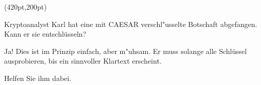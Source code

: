 

\PapierGroesse(420pt,200pt)



\parskip=5pt
\baselineskip=13pt
Kryptoanalyst Karl hat eine mit CAESAR verschl"usselte Botschaft abgefangen. Kann er sie entschlüsseln? 

Ja! Dies ist im Prinzip einfach, aber m"uhsam. Er muss solange alle Schlüssel ausprobieren, bis ein sinnvoller Klartext erscheint. 

Helfen Sie ihm dabei.

